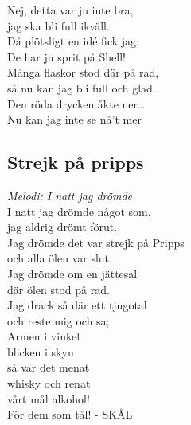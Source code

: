 \documentclass[a5paper]{article}
\begin{document}
\noindent
Nej, detta var ju inte bra, \\
jag ska bli full ikväll. \\
Då plötsligt en idé fick jag: \\
De har ju sprit på Shell! \\
Många flaskor stod där på rad, \\
så nu kan jag bli full och glad. \\
Den röda drycken åkte ner… \\
Nu kan jag inte se nå’t mer	\\
	
\subsection{Strejk på pripps}
\textit{Melodi: I natt jag drömde}\\

\noindent
I natt jag drömde något som,\\
jag aldrig drömt förut.\\ 
Jag drömde det var strejk på Pripps\\
och alla ölen var slut.\\
Jag drömde om en jättesal\\
där ölen stod på rad.\\
Jag drack så där ett tjugotal\\
och reste mig och sa;\\

\noindent
Armen i vinkel\\
blicken i skyn\\
så var det menat\\
whisky och renat\\
vårt mål alkohol!\\
För dem som tål! - SKÅL\\
\newpage
\end{document}
